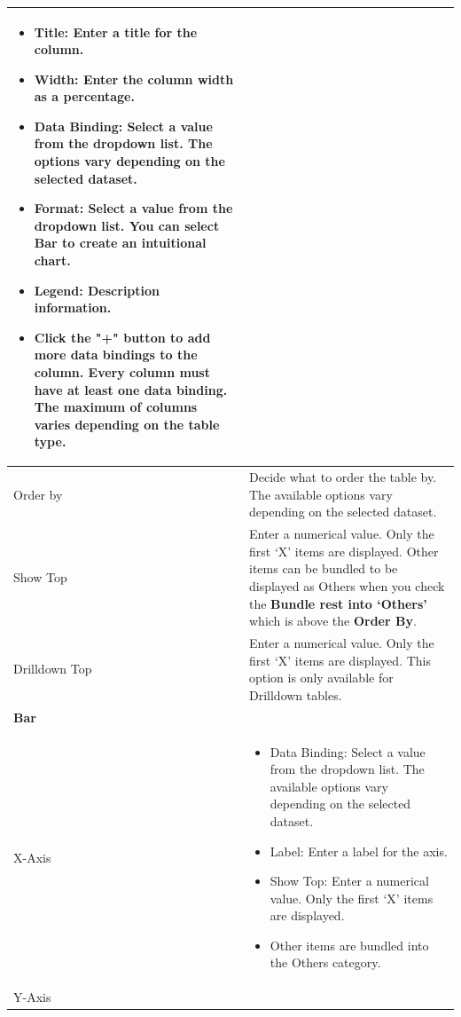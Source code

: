 \begin{description}
\begin{longtable}{p{}|p{}}
                    \begin{itemize}
                        \item Title: Enter a title for the column.
                        \item Width: Enter the column width as a percentage.
                        \item Data Binding: Select a value from the dropdown list. The options vary depending on the selected dataset.
                        \item Format: Select a value from the dropdown list. You can select Bar to create an intuitional chart.
                        \item Legend: Description information.
                        \item Click the "+" button to add more data bindings to the column. Every column must have at least one data binding. The maximum of columns varies depending on the table type.
                    \end{itemize} \\\hline 
        Order by & Decide what to order the table by. The available options vary depending on the selected dataset. \\\hline 
        Show Top & Enter a numerical value. Only the first ‘X’ items are displayed. 
                   Other items can be bundled to be displayed as Others when you check the \textbf{Bundle rest into ‘Others’} which is above the \textbf{Order By}. \\\hline 
        Drilldown Top & Enter a numerical value. Only the first ‘X’ items are displayed. This option is only available for Drilldown tables.\\\hline 
        \multicolumn{2}{l}{\textbf{Bar}}\\\hline
        X-Axis & \begin{itemize}
                    \item Data Binding: Select a value from the dropdown list. The available options vary depending on the selected dataset.
                    \item Label: Enter a label for the axis.
                    \item Show Top: Enter a numerical value. Only the first ‘X’ items are displayed.
                    \item Other items are bundled into the Others category.
                 \end{itemize} \\\hline 
        Y-Axis & \begin{itemize}

\end{itemize}
\end{longtable}
\end{description}
